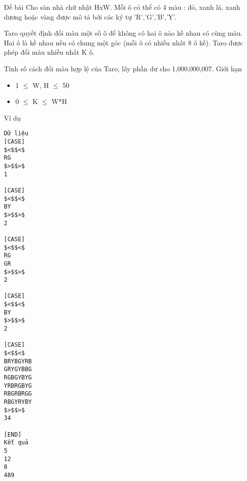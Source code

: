 Đề bài
Cho sàn nhà chữ nhật HxW. Mỗi ô có thể có 4 màu : đỏ, xanh lá, xanh dương hoặc vàng được mô tả bởi các ký tự 'R','G','B','Y'.  

   Taro quyết định đổi màu một số ô để không có hai ô nào kề nhau có cùng màu. Hai ô là kề nhau nếu có chung một góc (mỗi ô có nhiều nhất 8 ô kề). Taro được phép đổi màu nhiều nhất K ô.  

   Tính số cách đổi màu hợp lệ của Taro, lấy phần dư cho 1,000,000,007.
Giới hạn
\begin{itemize}
	\item     1  $\le$  W, H  $\le$  50   
	\item     0  $\le$  K  $\le$  W*H   
\end{itemize}
Ví dụ
\begin{verbatim}
Dữ liệu
[CASE]
$<$$<$
RG
$>$$>$
1

[CASE]
$<$$<$
BY
$>$$>$
2

[CASE]
$<$$<$
RG
GR
$>$$>$
2

[CASE]
$<$$<$
BY
$>$$>$
2

[CASE]
$<$$<$ 	
BRYBGYRB
GRYGYBBG
RGBGYBYG
YRBRGBYG
RBGRBRGG
RBGYRYBY
$>$$>$
34

[END]
Kết quả
5
12
8
489
\end{verbatim}